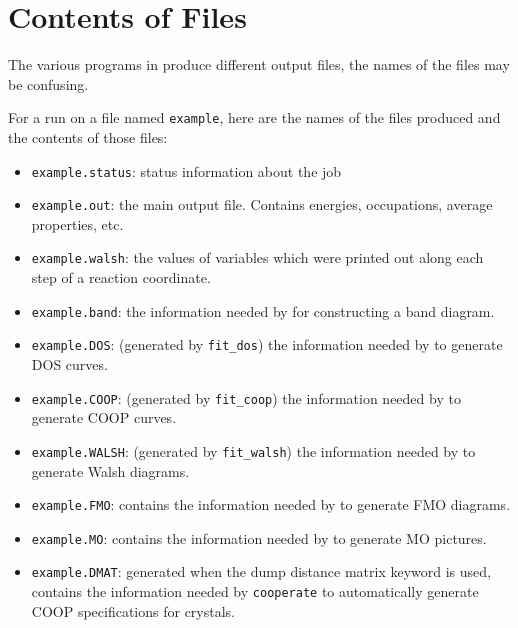 \chapter{Contents of Files}

The various programs in \prog{} produce different output files, the
names of the files may be confusing.

For a run on a file named {\tt example}, here are the names of
the files produced and the contents of those files:

\begin{itemize}

\item {\tt example.status}: status information about the job

\item {\tt example.out}: the main output file. Contains energies,
occupations, average properties, etc.

\item {\tt example.walsh}: the values of variables which were printed
out along each step of a reaction coordinate.

\item {\tt example.band}: the information needed by \viewprog{} for
constructing a band diagram.

\item {\tt example.DOS}: (generated by {\tt fit\_dos}) the information needed by \viewprog{} to
generate DOS curves.

\item {\tt example.COOP}: (generated by {\tt fit\_coop}) the
information needed by \viewprog{} to generate COOP curves.

\item {\tt example.WALSH}: (generated by {\tt fit\_walsh}) the
information needed by \viewprog{} to generate Walsh diagrams.

\item {\tt example.FMO}: contains the information needed by
\viewprog{} to generate FMO diagrams. 

\item {\tt example.MO}: contains the information needed by
\viewprog{} to generate MO pictures.

\item {\tt example.DMAT}: generated when the {\sf dump distance
matrix} keyword is used, contains the information needed by
{\tt cooperate} to automatically generate COOP specifications for
crystals. 


\end{itemize}

